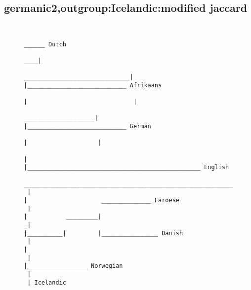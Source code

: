 \subsection{germanic2,outgroup:Icelandic:modified jaccard}
\begin{figure}[H]
\begin{center}
{
\selectfont
\begin{verbatim}

                                                                                                                        ______ Dutch
                                                                                                                   ____|
                                                                                    ______________________________|    |____________________________ Afrikaans
                                                                                   |                              |
                                                               ____________________|                              |____________________________ German
                                                              |                    |
                                                              |                    |_________________________________________________ English
  ____________________________________________________________|
 |                                                            |                     ______________ Faroese
 |                                                            |           _________|
_|                                                            |__________|         |________________ Danish
 |                                                                       |
 |                                                                       |_________________ Norwegian
 |
 | Icelandic



\end{verbatim}
}
\label{...}
\end{center}
\end{figure}
